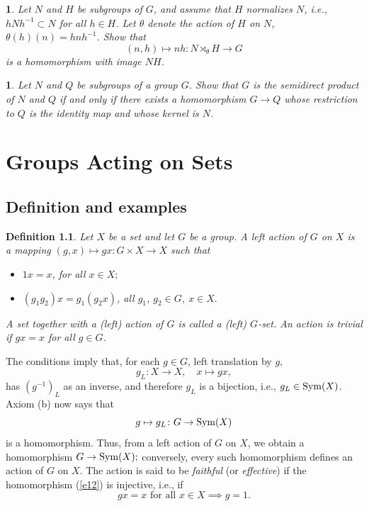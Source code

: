 \documentclass[a4paper,11pt,final]{memoir}%
\newtheorem{definition}[X]{Definition}
\newtheorem{exercise}[Y]{}
\theoremstyle{nonumberplain}
\begin{document}
\begin{exercise}
\label{x19d}Let $N$ and $H$ be subgroups of $G$, and assume that $H$
normalizes $N$, i.e., $hNh^{-1}\subset N$ for all $h\in H$. Let $\theta$
denote the action of $H$ on $N$, $\theta(h)(n)=hnh^{-1}$. Show that%
\[
(n,h)\mapsto nh\colon N\rtimes_{\theta}H\rightarrow G
\]
is a homomorphism with image $NH$.
\end{exercise}

\begin{exercise}
\label{x19e}Let $N$ and $Q$ be subgroups of a group $G$. Show that $G$ is the
semidirect product of $N$ and $Q$ if and only if there exists a homomorphism
$G\rightarrow Q$ whose restriction to $Q$ is the identity map and whose kernel
is $N$.
\end{exercise}

\clearpage


\chapter{Groups Acting on Sets}

\section{Definition and examples}

\begin{definition}
\label{ga01} Let $X$ be a set and let $G$ be a group. A \emph{left action\/}%
of $G$ on $X$ is a mapping $(g,x)\mapsto gx\colon G\times X\rightarrow X$ such that

\begin{itemize}
\item[(a)] $1x=x$, for all $x\in X;$

\item[(b)] $(g_{1}g_{2})x=g_{1}(g_{2}x)$, all $g_{1}$, $g_{2}\in G$, $x\in X.$
\end{itemize}

\noindent A set together with a (left) action of $G$ is called a (left)
$G$\emph{-set}.%
An action is \emph{trivial}
%
if $gx=x$ for all $g\in G$.
\end{definition}

The conditions imply that, for each $g\in G$, left translation by $g$,
\[
g_{L}\colon X\rightarrow X,\quad x\mapsto gx,
\]
has $(g^{-1})_{L}$ as an inverse, and therefore $g_{L}$ is a bijection, i.e.,
$g_{L}\in\operatorname{Sym}(X)$. Axiom (b) now says that
\begin{equation}
g\mapsto g_{L}\colon G\rightarrow\Sym(X) \label{e12}%
\end{equation}
is a homomorphism. Thus, from a left action of $G$ on $X$, we obtain a
homomorphism $G\rightarrow\operatorname{Sym}(X);$ conversely, every such homomorphism
defines an action of $G$ on $X$. The action is said to be \emph{faithful}%
(or \emph{effective})%
if the homomorphism (\ref{e12}) is injective, i.e., if%
\[
gx=x\text{ for all }x\in X\implies g=1.
\]
\end{document}
